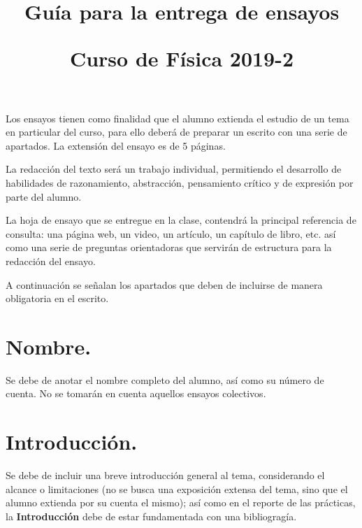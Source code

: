 
\usepackage[sfdefault]{roboto}  %
\usepackage[T1]{fontenc}
\title{Guía para la entrega de ensayos \\ \begin{Large}Curso de Física 2019-2\end{Large}}
\setlength{\voffset}{-1cm}

\maketitle
\vspace*{-2cm} 
\fontsize{14}{14}\selectfont
Los ensayos tienen como finalidad que el alumno extienda el estudio de un tema en particular del curso, para ello deberá de preparar un escrito con una serie de apartados. La extensión del ensayo es de 5 páginas.
\par
La redacción del texto será un trabajo individual, permitiendo el desarrollo de habilidades de razonamiento, abstracción, pensamiento crítico y de expresión por parte del alumno.
\par
La hoja de ensayo que se entregue en la clase, contendrá la principal referencia de consulta: una página web, un video, un artículo, un capítulo de libro, etc. así como una serie de preguntas orientadoras que servirán de estructura para la redacción del ensayo.
\par
A continuación se señalan los apartados que deben de incluirse de manera obligatoria en el escrito.
\section{Nombre.}
Se debe de anotar el nombre completo del alumno, así como su número de cuenta. No se tomarán en cuenta aquellos ensayos colectivos.
\section{Introducción.}
Se debe de incluir una breve introducción general al tema, considerando el alcance o limitaciones (no se busca una exposición extensa del tema, sino que el alumno extienda por su cuenta el mismo); así como en el reporte de las prácticas, la \textbf{Introducción }debe de estar fundamentada con una bibliogragía.
